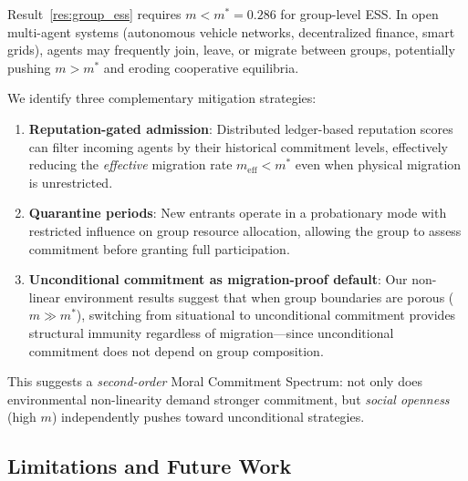 \documentclass{article}
\begin{document}
Result~\ref{res:group_ess} requires $m < m^* = 0.286$ for group-level ESS.
In open multi-agent systems (autonomous vehicle networks, decentralized finance, smart grids), agents may frequently join, leave, or migrate between groups, potentially pushing $m > m^*$ and eroding cooperative equilibria.

We identify three complementary mitigation strategies:
\begin{enumerate}
    \item \textbf{Reputation-gated admission}: Distributed ledger-based reputation scores~\citep{anastassacos2020cooperation} can filter incoming agents by their historical commitment levels, effectively reducing the \emph{effective} migration rate $m_{\text{eff}} < m^*$ even when physical migration is unrestricted.
    \item \textbf{Quarantine periods}: New entrants operate in a probationary mode with restricted influence on group resource allocation, allowing the group to assess commitment before granting full participation.
    \item \textbf{Unconditional commitment as migration-proof default}: Our non-linear environment results suggest that when group boundaries are porous ($m \gg m^*$), switching from situational to unconditional commitment provides structural immunity regardless of migration---since unconditional commitment does not depend on group composition.
\end{enumerate}

This suggests a \emph{second-order} Moral Commitment Spectrum: not only does environmental non-linearity demand stronger commitment, but \emph{social openness} (high $m$) independently pushes toward unconditional strategies.

\subsection{Limitations and Future Work}\label{sec:limitations}
\end{document}
